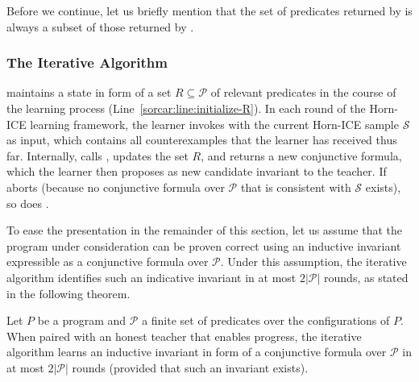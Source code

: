 Before we continue, let us briefly mention that the set of predicates returned by \sorcar is always a subset of those returned by \houdini.


\subsubsection{The Iterative \sorcar Algorithm}

\SorcarIterative maintains a state in form of a set $R \subseteq \mathcal P$ of relevant predicates in the course of the learning process (Line~\ref{sorcar:line:initialize-R}).
In each round of the Horn-ICE learning framework, the learner invokes \SorcarIterative with the current Horn-ICE sample $\mathcal S$ as input, which contains all counterexamples that the learner has received thus far.
Internally, \SorcarIterative calls \SorcarPassive, updates the set $R$, and returns a new conjunctive formula, which the learner then proposes as new candidate invariant to the teacher.
If \SorcarPassive aborts (because no conjunctive formula over $\mathcal P$ that is consistent with $\mathcal S$ exists), so does \SorcarIterative.

To ease the presentation in the remainder of this section, let us assume that the program under consideration can be proven correct using an inductive invariant expressible as a conjunctive formula over $\mathcal P$.
Under this assumption, the iterative \sorcar algorithm identifies such an indicative invariant in at most $2 |\mathcal P|$ rounds, as stated in the following theorem.

\begin{theorem} \label{thm:iterative_sorcar}
Let $P$ be a program and $\mathcal P$ a finite set of predicates over the configurations of $P$.
When paired with an honest teacher that enables progress, the iterative \sorcar algorithm learns an inductive invariant in form of a conjunctive formula over $\mathcal P$ in at most $2 |\mathcal P|$ rounds (provided that such an invariant exists).
\end{theorem}



